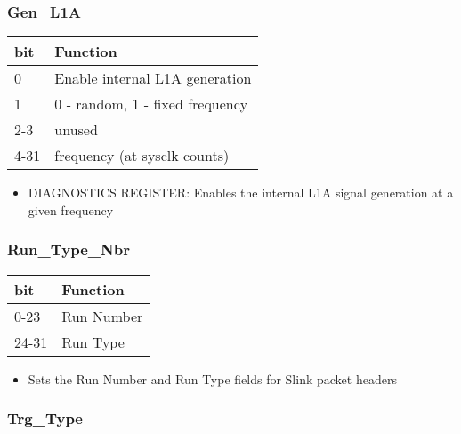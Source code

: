 \subsubsection{Gen\_L1A}

\begin {table}[H]
\begin{center}
\begin{tabular}{|l|l|}
\hline
\textbf{bit} & \textbf{Function} \\
\hline
0 & Enable internal L1A generation \\
\hline
1 & 0 - random, 1 - fixed frequency  \\
\hline
2-3 & unused \\
\hline
4-31 & frequency (at sysclk counts) \\
\hline
\end{tabular}
\end{center}
\end{table}


\begin{itemize}
\item DIAGNOSTICS REGISTER: Enables the internal L1A signal generation at a given frequency
\end{itemize}



\subsubsection{Run\_Type\_Nbr}

\begin {table}[H]
\begin{center}
\begin{tabular}{|l|l|}
\hline
\textbf{bit} & \textbf{Function} \\
\hline
0-23 & Run Number \\
\hline
24-31 & Run Type  \\
\hline
\end{tabular}
\end{center}
\end{table}


\begin{itemize}
\item Sets the Run Number and Run Type fields for Slink packet headers
\end{itemize}



\subsubsection{Trg\_Type}

